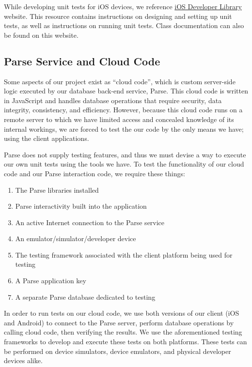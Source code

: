 While developing unit tests for iOS devices, we reference \href{https://developer.apple.com/library/ios/documentation/ToolsLanguages/Conceptual/Xcode_Overview/UnitTesting.html}
{iOS Developer Library} website. This resource contains instructions on
designing and setting up unit tests, as well as instructions on running unit
tests. Class documentation can also be found on this website.


\subsection{Parse Service and Cloud Code}

Some aspects of our project exist as ``cloud code'', which is custom server-side
logic executed by our database back-end service, Parse. This cloud code is
written in JavaScript and handles database operations that require security,
data integrity, consistency, and efficiency. However, because this cloud code
runs on a remote server to which we have limited access and concealed knowledge
of its internal workings, we are forced to test the our code by the only means
we have; using the client applications.

Parse does not supply testing features, and thus we must devise a way to execute
our own unit tests using the tools we have. To test the functionality of our
cloud code and our Parse interaction code, we require these things:

\begin{enumerate}
	\item The Parse libraries installed
	\item Parse interactivity built into the application
	\item An active Internet connection to the Parse service
	\item An emulator/simulator/developer device
	\item The testing framework associated with the client platform being used
	for testing
	\item A Parse application key
	\item A separate Parse database dedicated to testing
\end{enumerate}

In order to run tests on our cloud code, we use both versions of our client (iOS
and Android) to connect to the Parse server, perform database operations by
calling cloud code, then verifying the results. We use the aforementioned
testing frameworks to develop and execute these tests on both platforms. These
tests can be performed on device simulators, device emulators, and physical
developer devices alike.

